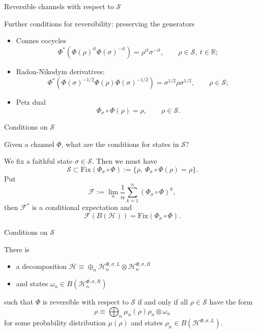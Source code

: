 \documentclass[mathserif]{beamer}
\newcommand{\<}{\langle}
\renewcommand{\>}{\rangle}
\newcommand{\Se}{\mathcal S}
\newcommand{\Fe}{\mathcal F}
\newcommand{\Ha}{\mathcal H}
\begin{document}
\begin{frame}{Reversible channels with respect to $\Se$}


 Further conditions for reversibility: preserving the generators
\medskip

\begin{itemize}

\item Connes cocycles
\[
\Phi^*(\Phi(\rho)^{it}\Phi(\sigma)^{-it})=\rho^{it}\sigma^{-it},\qquad \rho\in \Se,\ t\in
\mathbb R;
\]
\item Radon-Nikodym derivatives:
\[
\Phi^*(\Phi(\sigma)^{-1/2}\Phi(\rho)\Phi(\sigma)^{-1/2})=\sigma^{1/2}\rho\sigma^{1/2},\qquad
\rho\in \Se;
\]
\item Petz dual 
\[
\Phi_\sigma\circ \Phi(\rho)=\rho,\qquad \rho\in \Se.
\]

\end{itemize}

\end{frame}

\begin{frame}{Conditions on $\Se$}


Given a channel $\Phi$, what are the conditions for states in $\Se$? 

\bigskip

We fix a faithful state $\sigma\in \Se$. Then we must have
\[
\Se\subset \mathrm{Fix}(\Phi_\sigma\circ\Phi):=\{\rho,\ \Phi_\sigma\circ\Phi(\rho)=\rho\}.
\]
Put
\[
\Fe:=\lim_n \frac1n\sum_{k=1}^n(\Phi_\sigma\circ\Phi)^k,
\]
then $\Fe^*$ is a conditional expectation and
\[
\Fe(B(\Ha))=\mathrm{Fix}(\Phi_\sigma\circ\Phi).
\]



\end{frame}


\begin{frame}{Conditions on $\Se$}

There is 
\medskip
\begin{itemize}
\item a decomposition $\Ha\equiv \oplus_n
\Ha_n^{\Phi,\sigma,L}\otimes\Ha_n^{\Phi,\sigma,R}$
\item and states $\omega_n\in B(\Ha_n^{\Phi,\sigma,R})$ 

\end{itemize}
\medskip

such that $\Phi$ is reversible with respect to $\Se$ if and only if all $\rho\in \Se$ have
the form
\[
\rho\equiv \bigoplus_n \mu_n(\rho)\rho_n\otimes \omega_n
\]
for some probability distribution $\mu(\rho)$ and states $\rho_n\in B(\Ha^{\Phi,\sigma,L})$.



\end{frame}
\end{document}
